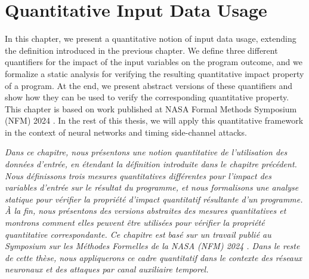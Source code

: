 
\setchapterpreamble[u]{\margintoc}
%

\chapter{Quantitative Input Data Usage}


In this chapter, we present a quantitative notion of input data usage, extending the definition introduced in the previous chapter.
We define three different quantifiers for the impact of the input variables on the program outcome, and we formalize a static analysis for verifying the resulting quantitative impact property of a program.
At the end, we present abstract versions of these quantifiers and show how they can be used to verify the corresponding quantitative property.
This chapter is based on work published at NASA Formal Methods Symposium (NFM) 2024 \cite{Mazzucato2024b}.
In the rest of this thesis, we will apply this quantitative framework in the context of neural networks and timing side-channel attacks.

\frenchdiv

\emph{Dans ce chapitre, nous présentons une notion quantitative de l'utilisation des données d'entrée, en étendant la définition introduite dans le chapitre précédent. Nous définissons trois mesures quantitatives différentes pour l'impact des variables d'entrée sur le résultat du programme, et nous formalisons une analyse statique pour vérifier la propriété d'impact quantitatif résultante d'un programme. À la fin, nous présentons des versions abstraites des mesures quantitatives et montrons comment elles peuvent être utilisées pour vérifier la propriété quantitative correspondante. Ce chapitre est basé sur un travail publié au Symposium sur les Méthodes Formelles de la NASA (NFM) 2024 . Dans le reste de cette thèse, nous appliquerons ce cadre quantitatif dans le contexte des réseaux neuronaux et des attaques par canal auxiliaire temporel.}



